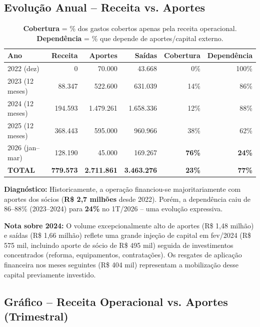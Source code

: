 \documentclass[12pt, a4paper]{article}
\begin{document}
\subsection{Evolução Anual -- Receita vs. Aportes}

\begin{table}[H]
    \centering
    \renewcommand{\arraystretch}{1.4}
    \begin{tabularx}{\textwidth}{X r r r r r}
        \toprule
        \rowcolor{tableHeader} \textbf{Ano} & \textbf{Receita} & \textbf{Aportes} & \textbf{Saídas} & \textbf{Cobertura} & \textbf{Dependência} \\
        \midrule
        2022 (dez) & 0 & 70.000 & 43.668 & 0\% & 100\% \\
        2023 (12 meses) & 88.347 & 522.600 & 631.039 & 14\% & 86\% \\
        2024 (12 meses) & 194.593 & 1.479.261 & 1.658.336 & 12\% & 88\% \\
        2025 (12 meses) & 368.443 & 595.000 & 960.966 & 38\% & 62\% \\
        \rowcolor{successGreen!15} 2026 (jan--mar) & 128.190 & 45.000 & 169.267 & \textbf{76\%} & \textbf{24\%} \\
        \midrule
        \rowcolor{lightGray} \textbf{TOTAL} & \textbf{779.573} & \textbf{2.711.861} & \textbf{3.463.276} & \textbf{23\%} & \textbf{77\%} \\
        \bottomrule
    \end{tabularx}
    \caption*{\footnotesize \textbf{Cobertura} = \% dos gastos cobertos apenas pela receita operacional. \textbf{Dependência} = \% que depende de aportes/capital externo.}
\end{table}

\textcolor{accentColor}{\textbf{Diagnóstico:}} Historicamente, a operação financiou-se majoritariamente com aportes dos sócios (\textbf{R\$ 2,7 milhões} desde 2022). Porém, a dependência caiu de 86--88\% (2023--2024) para \textbf{24\%} no 1T/2026 -- uma evolução expressiva.

\textbf{Nota sobre 2024:} O volume excepcionalmente alto de aportes (R\$ 1,48 milhão) e saídas (R\$ 1,66 milhão) reflete uma grande injeção de capital em fev/2024 (R\$ 575 mil, incluindo aporte de sócio de R\$ 495 mil) seguida de investimentos concentrados (reforma, equipamentos, contratações). Os resgates de aplicação financeira nos meses seguintes (R\$ 404 mil) representam a mobilização desse capital previamente investido.

\subsection{Gráfico -- Receita Operacional vs. Aportes (Trimestral)}
\end{document}

